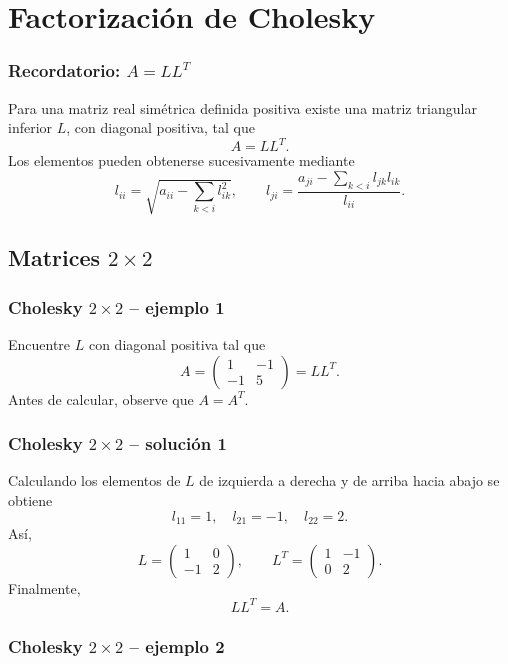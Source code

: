 \section{Factorización de Cholesky}

\subsubsection*{Recordatorio: $A=LL^T$}

Para una matriz real simétrica definida positiva existe una matriz triangular inferior $L$, con diagonal positiva, tal que
\[
\boxed{A=LL^T}.
\]
Los elementos pueden obtenerse sucesivamente mediante
\[
l_{ii}=\sqrt{a_{ii}-\sum_{k<i}l_{ik}^2},\qquad
l_{ji}=\frac{a_{ji}-\sum_{k<i}l_{jk}l_{ik}}{l_{ii}}.
\]

\subsection{Matrices $2\times 2$}

\subsubsection*{Cholesky $2\times 2$ -- ejemplo 1}

Encuentre $L$ con diagonal positiva tal que
\[
A=\begin{pmatrix}1 & -1\\-1 & 5\end{pmatrix}=LL^T.
\]
Antes de calcular, observe que $A=A^T$.


\subsubsection*{Cholesky $2\times 2$ -- solución 1}

Calculando los elementos de $L$ de izquierda a derecha y de arriba hacia abajo se obtiene
\[
l_{11}=1,\quad l_{21}=-1,\quad l_{22}=2.
\]
Así,
\[
L=\begin{pmatrix}1 & 0\\-1 & 2\end{pmatrix},\qquad L^T=\begin{pmatrix}1 & -1\\0 & 2\end{pmatrix}.
\]
Finalmente,
\[
\boxed{LL^T=A}.
\]


\subsubsection*{Cholesky $2\times 2$ -- ejemplo 2}


